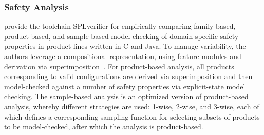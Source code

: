 

\subsubsection{Safety Analysis}
\label{sec:instance-splverifier}

\citet{ApelSimulator} provide the toolchain SPLverifier for empirically comparing family-based, 
product-based, and sample-based model checking of domain-specific safety properties in product lines 
written in C and Java. To manage variability, the authors leverage a compositional representation, using 
feature modules and derivation via superimposition~\cite{FeatureHouse}. For product-based analysis, all 
products corresponding to valid configurations are derived via superimposition and then model-checked 
against a number of safety properties via explicit-state model checking. The sample-based analysis is an 
optimized version of product-based analysis, whereby different strategies are used: 1-wise, 2-wise, and 
3-wise, each of which defines a corresponding sampling function for selecting subsets of products to be 
model-checked, after which the analysis is product-based.  

